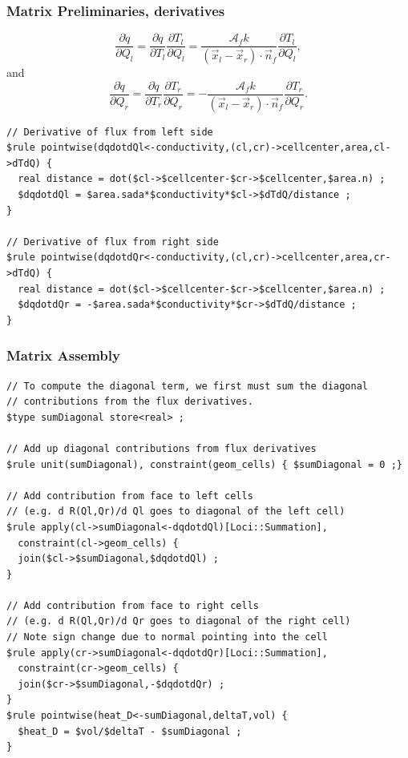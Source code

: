 \documentclass{beamer}
\begin{document}
\begin{frame}[fragile=singleslide]\frametitle{Matrix Preliminaries, derivatives}
\tiny
\begin{equation*}
\frac{\partial \dot{q}}{\partial Q_l} = \frac{\partial \dot{q}}{\partial T_l} \frac{\partial T_l}{\partial Q_l} = \frac{\mathcal{A}_f k }{(\vec{x}_l-\vec{x}_r)\cdot \vec{n}_f}\frac{\partial T_l}{\partial Q_l},
\end{equation*}
and
\begin{equation*}
\frac{\partial \dot{q}}{\partial Q_r} = \frac{\partial \dot{q}}{\partial T_r} \frac{\partial T_r}{\partial Q_r} = -\frac{\mathcal{A}_f k }{(\vec{x}_l-\vec{x}_r)\cdot \vec{n}_f}\frac{\partial T_r}{\partial Q_r}.
\end{equation*}

\begin{verbatim}
// Derivative of flux from left side
$rule pointwise(dqdotdQl<-conductivity,(cl,cr)->cellcenter,area,cl->dTdQ) {
  real distance = dot($cl->$cellcenter-$cr->$cellcenter,$area.n) ;
  $dqdotdQl = $area.sada*$conductivity*$cl->$dTdQ/distance ;
}

// Derivative of flux from right side
$rule pointwise(dqdotdQr<-conductivity,(cl,cr)->cellcenter,area,cr->dTdQ) {
  real distance = dot($cl->$cellcenter-$cr->$cellcenter,$area.n) ;
  $dqdotdQr = -$area.sada*$conductivity*$cr->$dTdQ/distance ;
}
\end{verbatim}
\end{frame}
\begin{frame}[fragile=singleslide]\frametitle{Matrix Assembly}
\tiny
\begin{verbatim}
// To compute the diagonal term, we first must sum the diagonal
// contributions from the flux derivatives.
$type sumDiagonal store<real> ;

// Add up diagonal contributions from flux derivatives
$rule unit(sumDiagonal), constraint(geom_cells) { $sumDiagonal = 0 ;}

// Add contribution from face to left cells
// (e.g. d R(Ql,Qr)/d Ql goes to diagonal of the left cell)
$rule apply(cl->sumDiagonal<-dqdotdQl)[Loci::Summation],
  constraint(cl->geom_cells) {
  join($cl->$sumDiagonal,$dqdotdQl) ;
}

// Add contribution from face to right cells 
// (e.g. d R(Ql,Qr)/d Qr goes to diagonal of the right cell)
// Note sign change due to normal pointing into the cell
$rule apply(cr->sumDiagonal<-dqdotdQr)[Loci::Summation],
  constraint(cr->geom_cells) {
  join($cr->$sumDiagonal,-$dqdotdQr) ;
}
$rule pointwise(heat_D<-sumDiagonal,deltaT,vol) {
  $heat_D = $vol/$deltaT - $sumDiagonal ; 
}
\end{verbatim}
\end{frame}
\end{document}
